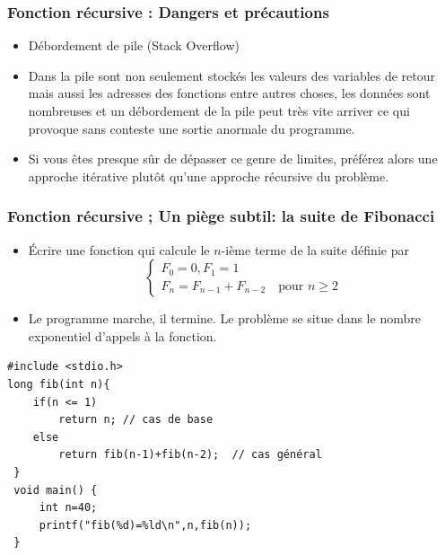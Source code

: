\documentclass{beamer}
\begin{document}
\begin{frame}[fragile]
\frametitle{Fonction récursive : Dangers et précautions}
 \begin{itemize}
\item Débordement de pile (Stack Overflow) 
\item Dans la pile sont non seulement stockés les valeurs des variables de retour mais aussi les adresses des fonctions entre autres choses, les données sont nombreuses et un débordement de la pile peut très vite arriver ce qui provoque sans conteste une sortie anormale du programme. 
\item Si vous êtes presque sûr de dépasser ce genre de limites, préférez alors une approche itérative plutôt qu'une approche récursive du problème.
 \end{itemize}
\end{frame}

\begin{frame}[fragile]
\frametitle{Fonction récursive ; Un piège subtil: la suite de Fibonacci}
 \begin{itemize}
\item Écrire une fonction qui calcule le $n$-ième terme de la suite définie par
\[\left\{\begin{array}{l}
F_0 = 0, F_1 = 1\\
F_n = F_{n-1} + F_{n-2}\quad\mbox{pour }n\geq 2
\end{array}\right.\]
\item Le programme marche, il termine. Le problème se situe dans le nombre exponentiel  d'appels à la fonction. 
 \end{itemize}
 
 \begin{verbatim} 
#include <stdio.h> 
long fib(int n){ 
    if(n <= 1) 
        return n; // cas de base 
    else 
        return fib(n-1)+fib(n-2);  // cas général 
 } 
 void main() {
     int n=40;
     printf("fib(%d)=%ld\n",n,fib(n));  
 } 
\end{verbatim}

\end{frame}
\end{document}
